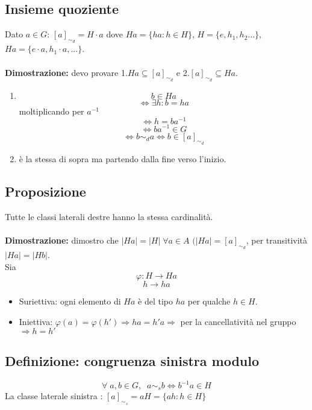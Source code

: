 \subsection{Insieme quoziente}
Dato \(a\in G\): \([a]_{\sim _d} = H\cdot a\) dove \(Ha=\{ha:h\in H\}\), \(H=\{e,h_1,h_2...\}\), \(Ha=\{e\cdot a,h_1\cdot a,...\}\).
\\
\\\textbf{Dimostrazione:} devo provare 1.\(Ha\subseteq [a]_{\sim _d}\) e 2.\([a]_{\sim _d}\subseteq Ha\).
\begin{enumerate}

	\item \[b\in Ha\]
	\[\Leftrightarrow \exists h:b=ha\]
	\center moltiplicando per \(a^{-1}\)
	\[\Leftrightarrow h=ba^{-1}\]
	\[\Leftrightarrow ba^{-1}\in G\]
	\[\Leftrightarrow b\sim _d a\Leftrightarrow b\in [a]_{\sim _d}\]

	\item è la stessa di sopra ma partendo dalla fine verso l'inizio.

\end{enumerate}

\subsection{Proposizione}
Tutte le classi laterali destre hanno la stessa cardinalità.
\\
\\\textbf{Dimostrazione:} dimostro che \(|Ha|=|H|\;\forall a\in A\) \((|Ha|=[a]_{\sim _d}\), per transitività \(|Ha|=|Hb|\).
\\Sia \[\varphi :H\rightarrow Ha\]
\[h\rightarrow ha\]

\begin{itemize}

	\item Suriettiva: ogni elemento di \(Ha\) è del tipo \(ha\) per qualche \(h\in H\).

	\item Iniettiva: \(\varphi (a)=\varphi (h')\Rightarrow ha=h'a\Rightarrow\) per la cancellatività nel gruppo \(\Rightarrow h=h'\)

\end{itemize}

\subsection{Definizione: congruenza sinistra modulo}
\[\forall \;a,b\in G,\;\;a\sim _s b\Leftrightarrow b^{-1}a\in H\]
La classe laterale sinistra : \([a]_{\sim _s}=aH=\{ah: h\in H\}\)
